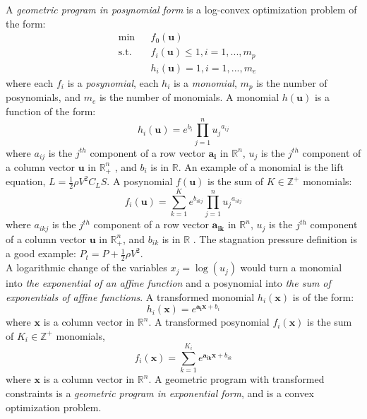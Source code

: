 A \emph{geometric program in posynomial form} is a log-convex optimization problem of the form:
\begin{equation}
\begin{aligned}
	& \text{min} && f_0 \left(\mathbf{u}\right) \\
	& \text{s.t.} && f_i \left(\mathbf{u}\right) \leq 1, i = 1,...,m_p\\
	& && h_i \left(\mathbf{u}\right) = 1, i = 1, ...,m_e
\end{aligned}
\label{GP_standard}
\end{equation}
where each $f_i$ is a {\em posynomial}, each $h_i$ is a {\em monomial}, $m_p$ is the number of posynomials,
and $m_e$ is the number of monomials. A monomial $h(\mathbf{u})$ is a function of the form:
\begin{equation}
	h_i(\mathbf{u}) = e^{b_i}\textstyle{\prod}_{j=1}^{n}{u_j}^{a_{ij}}
\end{equation}
where $a_{ij}$ is the $j^{th}$ component of a row vector $\mathbf{a_i}$ in $\mathbb{R}^n$,
$u_j$ is the $j^{th}$ component of a column vector $\mathbf{u}$ in $\mathbb{R}^n_+$ ,
and $b_i$ is in $\mathbb{R}$. An example of a monomial is the lift equation,
$L = \frac{1}{2}\rho V^2 C_L S$. A posynomial $f(\mathbf{u})$ is the sum of $K \in \mathbb{Z}^+$ monomials:
\begin{equation}
	f_i(\mathbf{u}) = \textstyle{\sum_{k=1}^{K}}e^{b_{ikj}}\prod_{j=1}^{n}{u_j}^{a_{ikj}}
\end{equation}
where $a_{ikj}$ is the $j^{th}$ component of a row vector $\mathbf{a_{ik}}$ in $\mathbb{R}^n$,
$u_j$ is the $j^{th}$ component of a column vector $\mathbf{u}$ in $\mathbb{R}^n_+$, and $b_{ik}$
is in $\mathbb{R}$ \cite{Boyd2007}. The stagnation pressure definition is a good example:
$P_t = P + \frac{1}{2} \rho V^2$.\\

A logarithmic change of the variables $x_j = \log(u_j)$ would turn a monomial into
{\em  the exponential of an affine function} and a posynomial into
{\em the sum of exponentials of affine functions}. A transformed monomial $h_i(\mathbf{x})$ is of the form:
\begin{equation}
    h_i(\mathbf{x}) = e^{\mathbf{a_i}\mathbf{x} + b_i}
\end{equation}
where $\mathbf{x}$ is a column vector in $\mathbb{R}^n$.
A transformed posynomial $f_i(\mathbf{x})$ is the sum of $K_i \in \mathbb{Z}^+$ monomials,
\begin{equation}
    f_i(\mathbf{x}) = \textstyle{\sum_{k=1}^{K_i}}e^{\mathbf{a_{ik}}\mathbf{x} + b_{ik}}
\end{equation}
where $\mathbf{x}$ is a column vector in $\mathbb{R}^n$.
A geometric program with transformed constraints is a \emph{geometric program in exponential form}, and
is a convex optimization problem.

